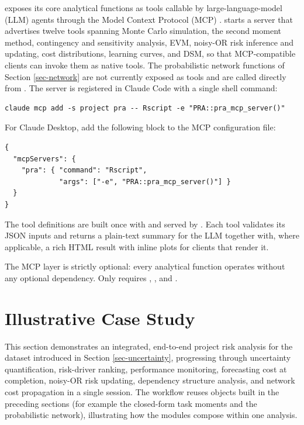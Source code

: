 \documentclass[
]{jss}
\begin{document}
 exposes its core analytical functions as tools callable by
large-language-model (LLM) agents through the Model Context Protocol
(MCP) \citep{MCP2024}.  starts a server that
advertises twelve tools spanning Monte Carlo simulation, the second
moment method, contingency and sensitivity analysis, EVM, noisy-OR risk
inference and updating, cost distributions, learning curves, and DSM, so
that MCP-compatible clients can invoke them as native tools. The
probabilistic network functions of Section \ref{sec-network} are not
currently exposed as tools and are called directly from .
The server is registered in Claude Code with a single shell command:

\begin{verbatim}
claude mcp add -s project pra -- Rscript -e "PRA::pra_mcp_server()"
\end{verbatim}

For Claude Desktop, add the following block to the MCP configuration
file:

\begin{verbatim}
{
  "mcpServers": {
    "pra": { "command": "Rscript",
             "args": ["-e", "PRA::pra_mcp_server()"] }
  }
}
\end{verbatim}

The tool definitions are built once with 
\citep{ellmer} and served by . Each tool validates its
JSON inputs and returns a plain-text summary for the LLM together with,
where applicable, a rich HTML result with inline plots for clients that
render it.

The MCP layer is strictly optional: every analytical function operates
without any optional dependency. Only  requires
, , and .

\section{Illustrative Case Study}\label{sec-casestudy}

This section demonstrates an integrated, end-to-end project risk
analysis for the  dataset introduced in Section
\ref{sec-uncertainty}, progressing through uncertainty quantification,
risk-driver ranking, performance monitoring, forecasting cost at
completion, noisy-OR risk updating, dependency structure analysis, and
network cost propagation in a single  session. The workflow
reuses objects built in the preceding sections (for example the
closed-form task moments and the probabilistic network), illustrating
how the modules compose within one analysis.
\end{document}
